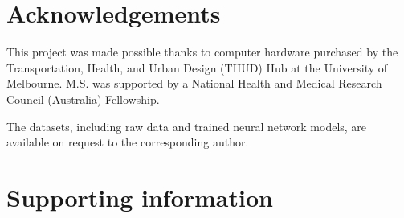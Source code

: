 \documentclass[10pt,letterpaper,hidelinks]{article}
\begin{document}
\section*{Acknowledgements}\label{sec:acknowledgements}
This project was made possible thanks to computer hardware purchased by the Transportation, Health, and Urban Design (THUD) Hub at the University of Melbourne. M.S. was supported by a National Health and Medical Research Council (Australia) Fellowship.

The datasets, including raw data and trained neural network models, are available on request to the corresponding author.


\nolinenumbers

%
%
% 
\begin{thebibliography}{}

% 
% 



\end{thebibliography}


\section*{Supporting information}

\end{document}
